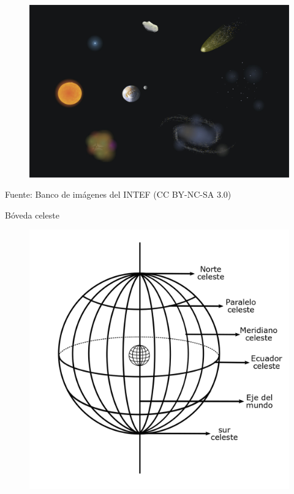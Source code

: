 \documentclass{beamer}
\begin{document}
\begin{frame}
\begin{figure}
 \centering
 \includegraphics[scale=0.55]{Imagenes/Cuerpos_celestes}
 \end{figure}
 \begin{center}
 \small
Fuente: Banco de imágenes del INTEF (CC BY-NC-SA 3.0)
\end{center}
\end{frame}

\begin{frame}{Bóveda celeste}
\begin{figure}
 \centering
 \includegraphics[scale=0.2]{Imagenes/boveda_celeste}
 \end{figure}
\end{frame}
\end{document}
